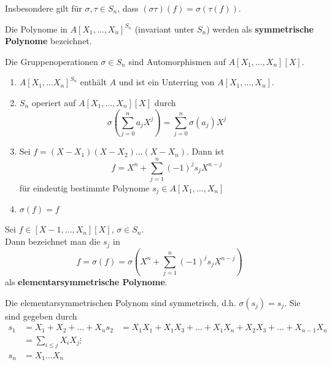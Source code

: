 	\begin{bem}
		Insbesondere gilt für $\sigma,\tau\in S_n$, dass $(\sigma\tau)(f)=\sigma(\tau(f))$.
	\end{bem}


	\begin{definition}
		Die Polynome in $A[X_1,...,X_n]^{S_n}$ (invariant unter $S_n$) werden als \textbf{symmetrische Polynome} bezeichnet.
	\end{definition}
	
	\begin{prop}
		Die Gruppenoperationen $\sigma\in S_n$ sind Automorphismen auf $A[X_1,...,X_n][X]$.
	\end{prop}
	
	\begin{satz}
		\begin{enumerate}
			\item $A[X_1,...X_n]^{S_n}$ enthält $A$ und ist ein Unterring von $A[X_1,...,X_n]$.\\
			\item $S_n$ operiert auf $A[X_1,...,X_n][X]$ durch
			\[\sigma\left(\sum_{j=0}^n a_jX^j\right)=\sum_{j=0}^{n}\sigma(a_j)X^j\]
			\item Sei $f=(X-X_1)(X-X_2)...(X-X_n)$. Dann ist
			\[f=X^n+\sum_{j=1}^{n}(-1)^js_jX^{n-j}\]
			für eindeutig bestimmte Polynome $s_j\in A[X_1,...,X_n]$
			\item $\sigma(f)=f$

		\end{enumerate}
	\end{satz}

	\begin{definition}
		Sei $f\in[X-1,...,X_n][X]$, $\sigma\in S_n$.\\
		Dann bezeichnet man die $s_j$ in
		\[f=\sigma(f)=\sigma\left(X^n+\sum_{j=1}^{n}(-1)^js_jX^{n-j}\right)\]
		als \textbf{elementarsymmetrische Polynome}.
	\end{definition}

	\begin{lem}
		Die elementarsymmetrischen Polynom sind symmetrisch, d.h. $\sigma(s_j)=s_j$. Sie sind gegeben durch
		\begin{align*}
		s_1&=X_1+X_2+...+X_n
		s_2&=X_1X_1+X_1X_3+...+X_1X_n+X_2X_3+...+X_{n-1}X_n\\
		&=\sum_{i\leq j} X_iX_j
		\vdots&\\
		s_n&=X_1...X_n
		\end{align*}
	\end{lem}


